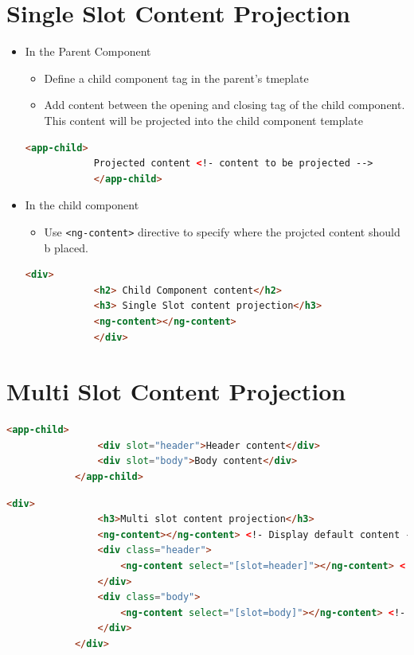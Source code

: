 \documentclass{report}
\begin{document}
\section{Single Slot Content Projection}
\begin{itemize}
	\item{In the Parent Component}
		\begin{itemize}
			\item{Define a child component tag in the parent's tmeplate}
			\item{Add content between the opening and closing tag of the child component. This content will be projected into the child component template}
		\end{itemize}
		\begin{lstlisting}[caption=app-parent.component.html,language=HTML]
			<app-child>
			Projected content <!- content to be projected --> 
			</app-child>
	\end{lstlisting}

\item{In the child component}
	\begin{itemize}
		\item{Use \lstinline{<ng-content>} directive to specify where the projcted content should b placed.}
	\end{itemize}
		\begin{lstlisting}[caption=app-child.component.html,language=HTML]
			<div> 
			<h2> Child Component content</h2>
			<h3> Single Slot content projection</h3>
			<ng-content></ng-content>
			</div>
\end{lstlisting}
\end{itemize}
\section{Multi Slot Content Projection}

		\begin{lstlisting}[caption=app-parent.component.html,language=HTML]
			<app-child>
				<div slot="header">Header content</div>
				<div slot="body">Body content</div>
			</app-child>
\end{lstlisting}

		\begin{lstlisting}[caption=app-child.component.html ,language=HTML]
			<div>
				<h3>Multi slot content projection</h3>
				<ng-content></ng-content> <!- Display default content --> 
				<div class="header">
					<ng-content select="[slot=header]"></ng-content> <!- Display specific content -->
				</div> 
				<div class="body">
					<ng-content select="[slot=body]"></ng-content> <!- Display specific content -->
				</div>
			</div>
\end{lstlisting}
\end{document}
